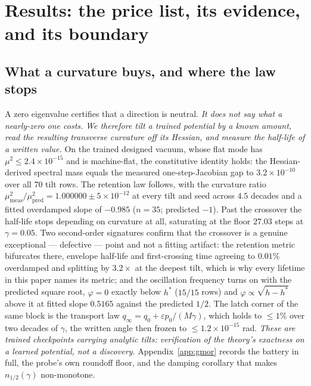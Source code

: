 \documentclass{article}
\begin{document}
\section{Results: the price list, its evidence, and its boundary}\label{sec:results}

\subsection{What a curvature buys, and where the law stops}\label{sec:pricelist}

A zero eigenvalue certifies that a direction is neutral. \emph{It does not say what a nearly-zero one costs.} \emph{We therefore tilt a trained potential by a known amount, read the resulting transverse curvature off its Hessian, and measure the half-life of a written value.} On the trained designed vacuum, whose flat mode has $\mu^2\le2.4\!\times\!10^{-15}$ and is machine-flat, the constitutive identity holds: the Hessian-derived spectral mass equals the measured one-step-Jacobian gap to $3.2\!\times\!10^{-10}$ over all $70$ tilt rows. The retention law follows, with the curvature ratio $\mu^2_{\mathrm{meas}}/\mu^2_{\mathrm{pred}}=1.000000\pm5\!\times\!10^{-12}$ at every tilt and seed across $4.5$ decades and a fitted overdamped slope of $-0.985$ ($n=35$; predicted $-1$). Past the crossover the half-life stops depending on curvature at all, saturating at the floor $27.03$ steps at $\gamma=0.05$. Two second-order signatures confirm that the crossover is a genuine exceptional --- defective --- point and not a fitting artifact: the retention metric bifurcates there, envelope half-life and first-crossing time agreeing to $0.01\%$ overdamped and splitting by $3.2\times$ at the deepest tilt, which is why every lifetime in this paper names its metric; and the oscillation frequency turns on with the predicted square root, $\varphi=0$ exactly below $h^*$ ($15/15$ rows) and $\varphi\propto\sqrt{h-h^*}$ above it at fitted slope $0.5165$ against the predicted $1/2$. The latch corner of the same block is the transport law $q_\infty=q_0+\varepsilon p_0/(M\gamma)$, which holds to $\le1\%$ over two decades of $\gamma$, the written angle then frozen to $\le1.2\!\times\!10^{-15}$ rad. \emph{These are trained checkpoints carrying analytic tilts: verification of the theory's exactness on a learned potential, not a discovery.} Appendix~\ref{app:gmor} records the battery in full, the probe's own roundoff floor, and the damping corollary that makes $n_{1/2}(\gamma)$ non-monotone.
\end{document}
